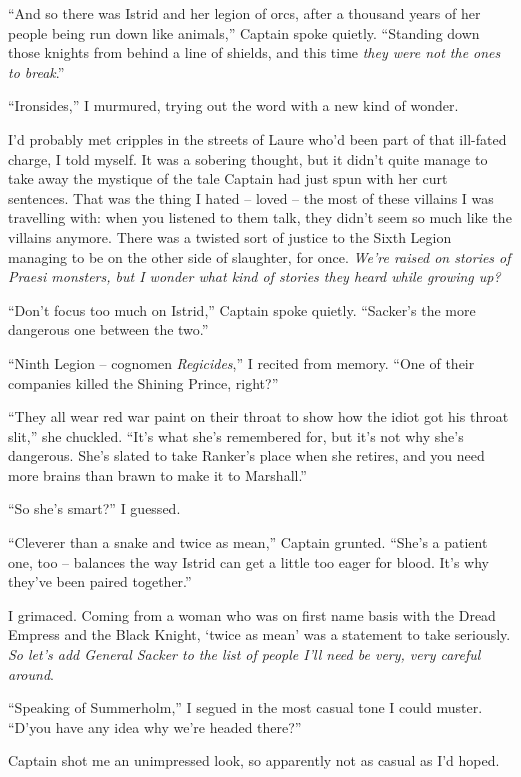 \documentclass[12pt, openany]{book}
\begin{document}
“And so there was Istrid and her legion of orcs, after a thousand years of her people being run down like animals,” Captain spoke quietly. “Standing down those knights from behind a line of shields, and this time \textit{they were not the ones to break}.”

“Ironsides,” I murmured, trying out the word with a new kind of wonder.

I’d probably met cripples in the streets of Laure who’d been part of that ill-fated charge, I told myself. It was a sobering thought, but it didn’t quite manage to take away the mystique of the tale Captain had just spun with her curt sentences. That was the thing I hated – loved – the most of these villains I was travelling with: when you listened to them talk, they didn’t seem so much like the villains anymore. There was a twisted sort of justice to the Sixth Legion managing to be on the other side of slaughter, for once. \textit{We’re raised on stories of Praesi monsters, but I wonder what kind of stories they heard while growing up?}

“Don’t focus too much on Istrid,” Captain spoke quietly. “Sacker’s the more dangerous one between the two.”

“Ninth Legion – cognomen \textit{Regicides},” I recited from memory. “One of their companies killed the Shining Prince, right?”

“They all wear red war paint on their throat to show how the idiot got his throat slit,” she chuckled. “It’s what she’s remembered for, but it’s not why she’s dangerous. She’s slated to take Ranker’s place when she retires, and you need more brains than brawn to make it to Marshall.”

“So she’s smart?” I guessed.

“Cleverer than a snake and twice as mean,” Captain grunted. “She’s a patient one, too – balances the way Istrid can get a little too eager for blood. It’s why they’ve been paired together.”

I grimaced. Coming from a woman who was on first name basis with the Dread Empress and the Black Knight, ‘twice as mean’ was a statement to take seriously.\textit{ So let’s add General Sacker to the list of people I’ll need be very, very careful around}.

“Speaking of Summerholm,” I segued in the most casual tone I could muster. “D’you have any idea why we’re headed there?”

Captain shot me an unimpressed look, so apparently not as casual as I’d hoped.
\end{document}
